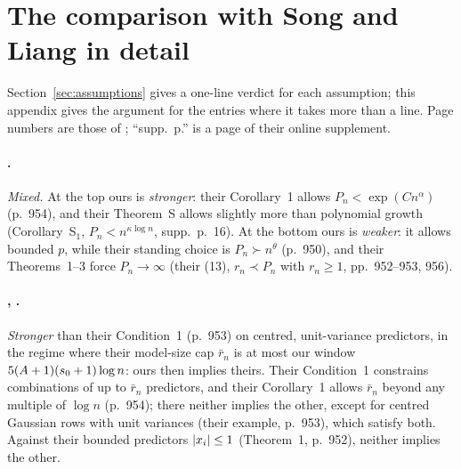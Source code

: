 \section{The comparison with Song and Liang in detail}\label{app:sl}

Section~\ref{sec:assumptions} gives a one-line verdict for each assumption; this appendix gives the argument for the
entries where it takes more than a line. Page numbers are those of \citet{SongLiang2015}; ``supp.\ p.'' is a page of their
online supplement.

\paragraph{.} \emph{Mixed.} At the top ours is \emph{stronger}: their Corollary~1 allows $P_n<\exp(Cn^\alpha)$ (p.~954), and their
Theorem~S allows slightly more than polynomial growth (Corollary~S$_1$, $P_n<n^{\kappa\log n}$, supp.\ p.~16). At the
bottom ours is \emph{weaker}: it allows bounded $p$, while their standing choice is $P_n\succ n^\theta$ (p.~950), and
their Theorems~1--3 force $P_n\to\infty$ (their (13), $r_n\prec P_n$ with $r_n\ge1$, pp.~952--953, 956).

\paragraph{, .} \emph{Stronger} than their Condition~1 (p.~953) on centred, unit-variance predictors, in the regime where their
model-size cap $\bar r_n$ is at most our window $5(A+1)(s_0+1)\log n$: ours then implies theirs. Their Condition~1 constrains
combinations of up to $\bar r_n$ predictors, and their Corollary~1 allows $\bar r_n$ beyond any multiple of $\log n$
(p.~954); there neither implies the other, except for centred Gaussian rows with unit variances (their example, p.~953),
which satisfy both. Against their bounded predictors
$\lvert x_i\rvert\le1$ (Theorem~1, p.~952), neither implies the other.

